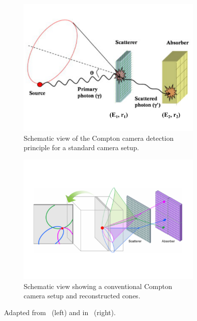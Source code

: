 \begin{figure}
\centering
\begin{subfigure}[t]{.49\textwidth}
\includegraphics[width=1.0\linewidth]{03_GraphicFiles/chapter2_GammaCameras/ComptonCamera_principle.png}
\caption{Schematic view of the Compton camera detection principle for a standard camera setup.}
\label{chap2::fig::CC_detPrinciple}
\end{subfigure}
\begin{subfigure}[t]{.49\textwidth}
\includegraphics[width=1.0\linewidth]{03_GraphicFiles/chapter2_GammaCameras/Compton_cones.pdf}
\caption{Schematic view showing a conventional Compton camera setup and reconstructed cones.}
\label{chap2::fig::CC_cones}
\end{subfigure}
\caption{Adapted from~\cite{Seo2010} (left) and in~\cite{Kim2013} (right).}
\label{chap2::fig::CC_basics}
\end{figure}

